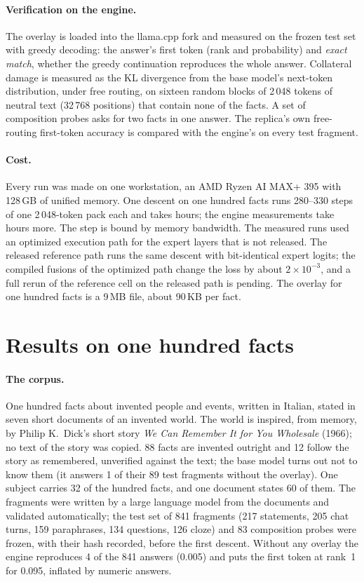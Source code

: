 \documentclass[10pt,a4paper]{article}
\begin{document}
\paragraph{Verification on the engine.} The overlay is loaded into the llama.cpp fork and
measured on the frozen test set with greedy decoding: the answer's first token (rank and
probability) and \emph{exact match}, whether the greedy continuation reproduces the whole
answer. Collateral damage is measured as the KL divergence from the base model's
next-token distribution, under free routing, on sixteen random blocks of 2\,048 tokens of
neutral text (32\,768 positions) that contain none of the facts. A set of composition
probes asks for two facts in one answer. The replica's own free-routing first-token
accuracy is compared with the engine's on every test fragment.

\paragraph{Cost.} Every run was made on one workstation, an AMD Ryzen AI MAX+ 395 with
128\,GB of unified memory. One descent on one hundred facts runs 280--330 steps of one
2\,048-token pack each and takes hours; the engine measurements take hours more. The step is
bound by memory bandwidth. The measured runs used an optimized execution path for the expert
layers that is not released. The released reference path runs the same descent with
bit-identical expert logits; the compiled fusions of the optimized path change the loss by
about $2\times10^{-3}$, and a full rerun of the reference cell on the released path is
pending. The overlay for one hundred facts is a 9\,MB file, about 90\,KB per fact.

\section{Results on one hundred facts}
\label{sec:results}

\paragraph{The corpus.} One hundred facts about invented people and events, written in
Italian, stated in seven short documents of an invented world. The world is inspired, from
memory, by Philip K.~Dick's short story \emph{We Can Remember It for You Wholesale} (1966); no
text of the story was copied. 88 facts are invented outright and 12 follow the story as
remembered, unverified against the text; the base model turns out not to know them (it
answers 1 of their 89 test fragments without the overlay). One subject carries 32 of
the hundred facts, and one document states 60 of them. The fragments were written by a
large language model from the documents and validated automatically; the test set of
841 fragments (217 statements, 205 chat turns, 159 paraphrases, 134 questions, 126 cloze)
and 83 composition probes were frozen, with their hash recorded, before the first descent.
Without any overlay the engine reproduces 4 of the 841 answers (0.005) and puts the first
token at rank~1 for 0.095, inflated by numeric answers.
\end{document}
